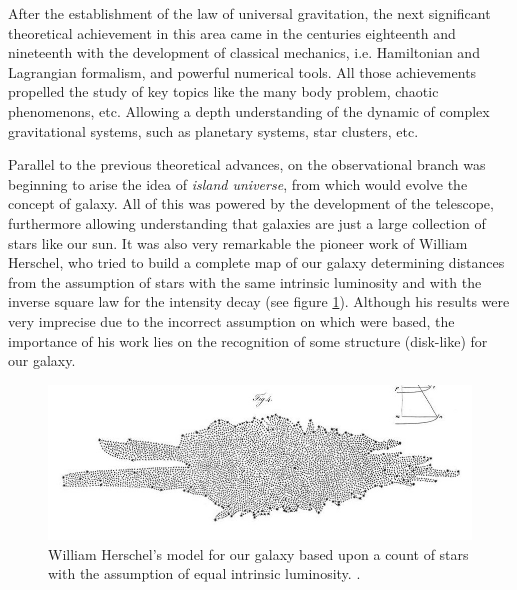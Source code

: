 After the establishment of the law of universal gravitation, the next 
significant theo\-retical achievement in this area came in the centuries 
eighteenth and nineteenth with the development of classical mechanics, i.e.
Hamiltonian and Lagrangian formalism, and powerful numerical tools. All
those achievements propelled the study of key topics like the many body 
problem, chaotic phenomenons, etc. Allowing a depth understanding of the 
dynamic of complex gravitational systems, such as planetary systems, star 
clusters, etc. 


Parallel to the previous theoretical advances, on the observational branch 
was beginning to arise the idea of \textit{island universe}, from which 
would evolve the concept of galaxy. All of this was powered by the 
development of the telescope, furthermore allowing understanding that  
galaxies are just a large collection of stars like our sun. It was also 
very remarkable the pioneer work of William Herschel, who tried to build a
complete map of our galaxy determining distances from the assumption of 
stars with the same intrinsic luminosity and with the inverse square law 
for the intensity decay (see figure \ref{fig:HerschelModel}). 
Although his results were very imprecise due to the incorrect assumption 
on which were based, the importance of his work lies on the recognition of 
some structure (disk-like) for our galaxy. 


\begin{figure}[htbp]
	\centering
	\includegraphics[width=1.0\textwidth]
	{./figures/1_introduction/Herschel_Model.png}
	
	\caption{\small{William Herschel's model for our galaxy based upon a 
	count of stars with the assumption of equal intrinsic luminosity.
	\cite{Herschel1785}.}}
	
	\label{fig:HerschelModel}
\end{figure}
\newpage

